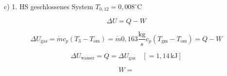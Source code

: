 c) 1. HS geschlossenes System $T_{0,12} = 0,008^\circ \text{C}$

\[
\Delta U = Q - W
\]

\[
\Delta U_{\text{gas}} = \dot{m} c_p (T_3 - T_{\text{om}}) = \dot{m} 0,163 \frac{\text{kg}}{s} c_p (T_{\text{gm}} - T_{\text{om}}) = Q - W
\]

\[
\Delta U_{\text{wasser}} = Q = \Delta U_{\text{gas}} \quad \left[ = 1,14 \, \text{kJ} \right]
\]

\[
W = 
\]